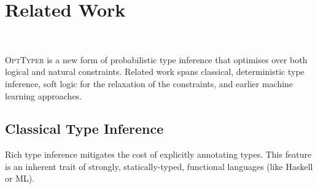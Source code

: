 \documentclass[acmsmall, review, anonymous]{acmart}\settopmatter{printfolios=true,printccs=false,printacmref=false}
\newcommand{\projectname}{\textsc{OptTyper}\xspace}
\newcommand{\margincomment}[2]{\marginpar{\scriptsize\color{Maroon}#1 says: #2}}
\newcommand{\adg}[1]{\margincomment{ADG}{#1}}
\newcommand{\etb}[1]{\margincomment{Earl}{#1}}
\begin{document}


\section{Related Work}~\label{sec:related}

\projectname is a new form of probabilistic type inference that optimises over
both logical and natural constraints.  Related work spans classical, deterministic
type inference, soft logic for the relaxation of the constraints, and earlier machine learning approaches.

\subsection{Classical Type Inference}


Rich type inference mitigates the cost
of explicitly annotating types. This feature is an
inherent trait of strongly, statically-typed, functional languages (like Haskell or ML).

\end{document}
